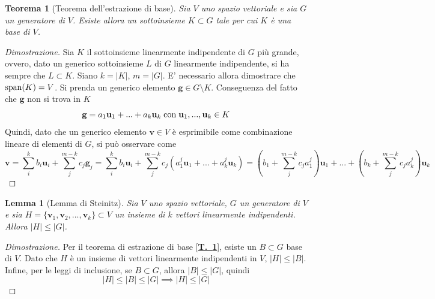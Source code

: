 \documentclass{article}
\newtheorem{theorem}{Teorema}
\newtheorem{lemma}{Lemma}
\begin{document}
    \vspace{10pt}
    \begin{theorem}[Teorema dell'estrazione di base] \label{thm:basis_extraction}
        Sia $V$ uno spazio vettoriale e sia $G$ un generatore di $V$. Esiste allora un sottoinsieme $K \subset G$ tale per cui $K$ è una base di $V$.
    \end{theorem}
    \begin{proof}[Dimostrazione]
        Sia $K$ il sottoinsieme linearmente indipendente di $G$ più grande, ovvero, dato un generico sottoinsieme $L$ di $G$ linearmente indipendente, si ha sempre che $L \subset K$. Siano $k = |K|$, $m = |G|$.
        E' necessario allora dimostrare che $\textnormal{span}(K) = V$. Si prenda un generico elemento $\mathbf{g} \in G \setminus K$. Conseguenza del fatto che $\mathbf{g}$ non si trova in $K$
        \[
            \mathbf{g} = a_1 \mathbf{u}_{1} + ... + a_k \mathbf{u}_{k} \; \textnormal{con} \; \mathbf{u}_{1}, ..., \mathbf{u}_{k} \in K
        \]
        Quindi, dato che un generico elemento $\mathbf{v} \in V$ è esprimibile come combinazione lineare di elementi di $G$, si può osservare come 
        \[
            \mathbf{v} = \sum_{i}^{k} b_i \mathbf{u}_{i} + \sum_{j}^{m - k} c_j \mathbf{g}_{j} = \sum_{i}^{k} b_i \mathbf{u}_{i} + \sum_{j}^{m - k} c_j (a_{1}^{j} \mathbf{u}_{1} + ... + a_{k}^{j} \mathbf{u}_{k}) = (b_1 + \sum_{j}^{m-k} c_j a_{1}^{j}) \mathbf{u}_{1} + ... + (b_k + \sum_{j}^{m-k} c_j a_{k}^{j}) \mathbf{u}_{k}
        \]
    \end{proof}

    \vspace{10pt}
    \begin{lemma}[Lemma di Steinitz]
        Sia $V$ uno spazio vettoriale, $G$ un generatore di $V$ e sia $H = \{\mathbf{v}_1, \mathbf{v}_2, ..., \mathbf{v}_k\} \subset V$ un insieme di $k$ vettori linearmente indipendenti.
        Allora $|H| \leq |G|$.
    \end{lemma}

    \begin{proof}[Dimostrazione] 
        Per il teorema di estrazione di base [{\bfseries \hyperref[thm:basis_extraction]{T.~\ref{thm:basis_extraction}}}], esiste un $B \subset G$ base di $V$. Dato che $H$ è un insieme di vettori linearmente indipendenti in $V$, $|H| \leq |B|$. 
        Infine, per le leggi di inclusione, se $B \subset G$, allora $|B| \leq |G|$, quindi
        \[
            |H| \leq |B| \leq |G| \implies |H| \leq |G|
        \]
    \end{proof}
    
\end{document}
